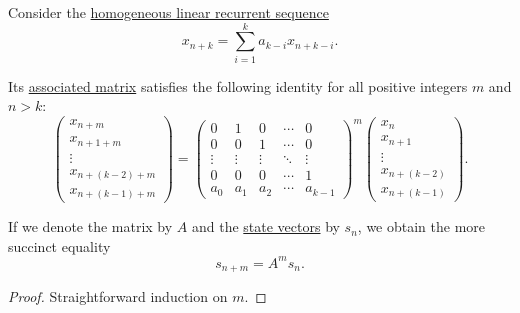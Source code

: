 \begin{proposition}\label{thm:homogeneous_linear_recurrence_matrix_action}
  Consider the \hyperref[def:homogeneous_linear_recurrence]{homogeneous linear recurrent sequence}
  \begin{equation*}
    x_{n+k} = \sum_{i=1}^k a_{k-i} x_{n+k-i}.
  \end{equation*}

  Its \hyperref[def:homogeneous_linear_recurrence_matrix]{associated matrix} satisfies the following identity for all positive integers \( m \) and \( n > k \):
  \begin{equation}\label{eq:thm:linear_recurrence_relation}
    \begin{pmatrix}
      x_{n+m}       \\
      x_{n+1+m}     \\
      \vdots        \\
      x_{n+(k-2)+m} \\
      x_{n+(k-1)+m}
    \end{pmatrix}
    =
    \begin{pmatrix}
      0      & 1      & 0      & \cdots & 0      \\
      0      & 0      & 1      & \cdots & 0      \\
      \vdots & \vdots & \vdots & \ddots & \vdots \\
      0      & 0      & 0      & \cdots & 1      \\
      a_0    & a_1    & a_2    & \cdots & a_{k-1}
    \end{pmatrix}^m
    \begin{pmatrix}
      x_{n}       \\
      x_{n+1}     \\
      \vdots      \\
      x_{n+(k-2)} \\
      x_{n+(k-1)}
    \end{pmatrix}.
  \end{equation}

  If we denote the matrix by \( A \) and the \hyperref[def:recurrence_relation/state]{state vectors} by \( s_n \), we obtain the more succinct equality
  \begin{equation}\label{eq:thm:homogeneous_linear_recurrence_matrix_action/state}
    s_{n+m} = A^m s_n.
  \end{equation}
\end{proposition}
\begin{proof}
  Straightforward induction on \( m \).
\end{proof}

